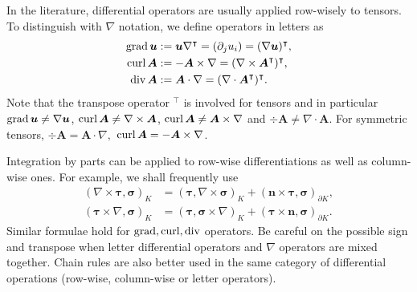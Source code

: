 In the literature, differential operators are usually applied row-wisely to tensors. To distinguish with $\nabla$ notation, we define operators in letters as
\begin{align*}
\operatorname{grad} \boldsymbol  u &:= \boldsymbol  u \nabla^{\intercal} = (\partial_j u_i ) = (\nabla \boldsymbol  u)^{\intercal},\\
\operatorname{curl} \boldsymbol  A &: = - \boldsymbol  A\times \nabla = (\nabla \times \boldsymbol  A^{\intercal})^{\intercal},\\
\operatorname{div} \boldsymbol  A &: = \boldsymbol  A\cdot \nabla = (\nabla \cdot \boldsymbol  A^{\intercal})^{\intercal}.
\end{align*}
Note that the transpose operator $^{\intercal}$ is involved for tensors and in particular $\operatorname{grad} \boldsymbol  u \neq \nabla \boldsymbol  u$, $\operatorname{curl} \boldsymbol  A\neq \nabla \times \boldsymbol  A$, $\operatorname{curl} \boldsymbol  A\neq \boldsymbol  A\times \nabla$ and $\div \boldsymbol  A\neq \nabla \cdot \boldsymbol  A$. 
For symmetric tensors, $\div \boldsymbol  A = \boldsymbol  A\cdot \nabla,$ $\operatorname{curl} \boldsymbol  A = - \boldsymbol  A \times \nabla$. 



Integration by parts can be applied to row-wise differentiations as well as column-wise ones. For example, we shall frequently use
\begin{align*}
(\nabla \times \boldsymbol  \tau, \boldsymbol  \sigma)_K &= (\boldsymbol  \tau, \nabla \times \boldsymbol  \sigma)_{K} + (\boldsymbol  n\times \boldsymbol  \tau, \boldsymbol  \sigma)_{\partial K},\\
(\boldsymbol  \tau \times \nabla, \boldsymbol  \sigma)_K &= (\boldsymbol  \tau, \boldsymbol  \sigma \times \nabla)_{K} + (\boldsymbol  \tau \times \boldsymbol  n, \boldsymbol  \sigma)_{\partial K}.
\end{align*}
Similar formulae hold for $\operatorname{grad}, \operatorname{curl}, \operatorname{div}$ operators. Be careful on the possible sign and transpose when letter differential operators and $\nabla$ operators are mixed together. Chain rules are also better used in the same category of differential operations (row-wise, column-wise or letter operators). 



